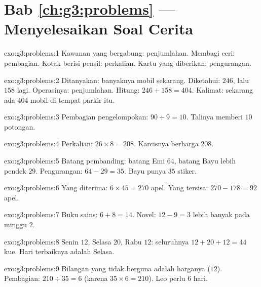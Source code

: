 \section*{Bab \ref{ch:g3:problems} --- Menyelesaikan Soal Cerita}

\begin{solution}{exo:g3:problems:1}
Kawanan yang bergabung: penjumlahan. Membagi ceri: pembagian. Kotak
berisi pensil: perkalian. Kartu yang diberikan: pengurangan.
\end{solution}

\begin{solution}{exo:g3:problems:2}
Ditanyakan: banyaknya mobil sekarang. Diketahui: $246$, lalu $158$
lagi. Operasinya: penjumlahan. Hitung: $246 + 158 = 404$. Kalimat:
sekarang ada $404$ mobil di tempat parkir itu.
\end{solution}

\begin{solution}{exo:g3:problems:3}
Pembagian pengelompokan: $90 \div 9 = 10$. Talinya memberi $10$ potongan.
\end{solution}

\begin{solution}{exo:g3:problems:4}
Perkalian: $26 \times 8 = 208$. Karcisnya berharga $208$.
\end{solution}

\begin{solution}{exo:g3:problems:5}
Batang pembanding: batang Emi $64$, batang Bayu lebih pendek $29$.
Pengurangan: $64 - 29 = 35$. Bayu punya $35$ stiker.
\end{solution}

\begin{solution}{exo:g3:problems:6}
Yang diterima: $6 \times 45 = 270$ apel. Yang tersisa:
$270 - 178 = 92$ apel.
\end{solution}

\begin{solution}{exo:g3:problems:7}
Buku sains: $6 + 8 = 14$. Novel: $12 - 9 = 3$ lebih banyak pada minggu 2.
\end{solution}

\begin{solution}{exo:g3:problems:8}
Senin $12$, Selasa $20$, Rabu $12$: seluruhnya
$12 + 20 + 12 = 44$ kue. Hari terbaiknya adalah Selasa.
\end{solution}

\begin{solution}{exo:g3:problems:9}
Bilangan yang tidak berguna adalah harganya ($12$). Pembagian:
$210 \div 35 = 6$ (karena $35 \times 6 = 210$). Leo perlu $6$ hari.
\end{solution}


